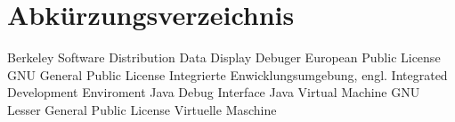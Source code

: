 
\chapter*{Abkürzungsverzeichnis}

\begin{acronym}
	 {Berkeley Software Distribution}
	 {Data Display Debuger}
	 {European Public License}
	 {GNU General Public License}
	 {Integrierte Enwicklungsumgebung, engl. Integrated Development Enviroment}
	 {Java Debug Interface}
	 {Java Virtual Machine}
	 {GNU Lesser General Public License}
	 {Virtuelle Maschine}
\end{acronym}